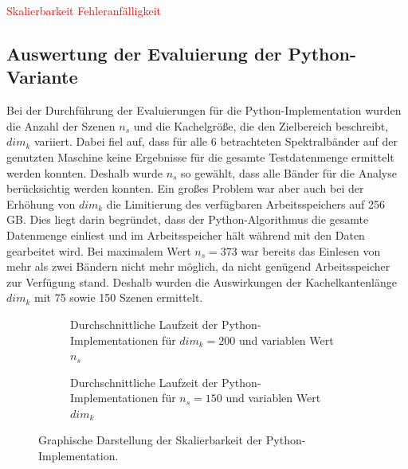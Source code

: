 \textcolor{red}{Skalierbarkeit}
\textcolor{red}{Fehleranfälligkeit}

\subsection{Auswertung der Evaluierung der Python-Variante}
Bei der Durchführung der Evaluierungen für die Python-Implementation wurden die Anzahl der Szenen $n_s$ und die Kachelgröße, die den Zielbereich beschreibt, $dim_k$ variiert. Dabei fiel auf, dass für alle 6 betrachteten Spektralbänder auf der genutzten Maschine keine Ergebnisse für die gesamte Testdatenmenge ermittelt werden konnten. Deshalb wurde $n_s$ so gewählt, dass alle Bänder für die Analyse berücksichtig werden konnten. Ein großes Problem war aber auch bei der Erhöhung von $dim_k$ die Limitierung des verfügbaren Arbeitsspeichers auf 256 GB. Dies liegt darin begründet, dass der Python-Algorithmus die gesamte Datenmenge einliest und im Arbeitsspeicher hält während mit den Daten gearbeitet wird. Bei maximalem Wert $n_s = 373$ war bereits das Einlesen von mehr als zwei Bändern nicht mehr möglich, da nicht genügend Arbeitsspeicher zur Verfügung stand. Deshalb wurden die Auswirkungen der Kachelkantenlänge $dim_k$ mit 75 sowie 150 Szenen ermittelt.

\begin{figure}
\captionsetup[subfigure]{justification=centering}
\centering
	\begin{subfigure}{.45\textwidth}
		\centering
		\caption{Durchschnittliche Laufzeit der Python-Implementationen für $dim_k = 200$ und variablen Wert $n_s$}
  		\label{fig:diagrammPythonNS}
	\end{subfigure}\hfill
	\begin{subfigure}{.45\textwidth}
  		\centering
		\caption{Durchschnittliche Laufzeit der Python-Implementationen für $n_s = 150$ und variablen Wert $dim_k$}
  		\label{fig:diagrammPythonDimK}
	\end{subfigure}
\caption{Graphische Darstellung der Skalierbarkeit der Python-Implementation.}
\label{fig:diagrammsPython}
\end{figure}


